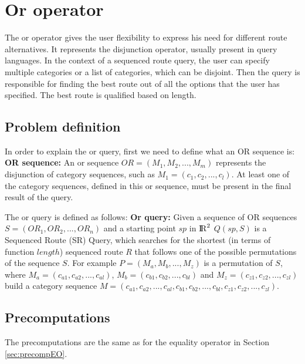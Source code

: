 

\section{Or operator}
The or operator gives the user flexibility to express his need for different route alternatives. It represents the disjunction operator, usually present in query languages. In the context of a sequenced route query, the user can specify multiple categories or a list of categories, which can be disjoint. Then the query is responsible for finding the best route out of all the options that the user has specified. The best route is qualified based on length.

\subsection{Problem definition} 
\label{sec:problemOr}
In order to explain the or query, first we need to define what an OR sequence is:\newline
\textbf{OR sequence:} An or sequence $OR = (M_1, M_2, ..., M_m)$ represents the disjunction of category sequences, such as $M_1 = (c_1, c_2, ..., c_l)$. At least one of the category sequences, defined in this or sequence, must be present in the final result of the query.\newline

The or query is defined as follows: \newline
\textbf{Or query:} Given a sequence of OR sequences $S = (OR_1, OR_2, ..., OR_n)$ and a starting point $sp$ in ${\rm I\!R}^2$
$Q(sp, S)$ is a Sequenced Route (SR) Query, which searches for the shortest (in terms of function $length$) sequenced route $R$ that follows one of the possible permutations of the sequence $S$. 
For example $P = (M_a, M_b, ..., M_z)$ is a permutation of $S$, where $M_a = (c_{a1}, c_{a2}, ..., c_{al})$, $M_b = (c_{b1}, c_{b2}, ..., c_{bl})$ and $M_z = (c_{z1}, c_{z2}, ..., c_{zl})$ build a category sequence \newline
$M = (c_{a1}, c_{a2}, ..., c_{al}, c_{b1}, c_{b2}, ..., c_{bl}, c_{z1}, c_{z2}, ..., c_{zl})$.

\subsection{Precomputations} 
\label{sec:precompOr}
The precomputations are the same as for the equality operator in Section \ref{sec:precompEO}.

